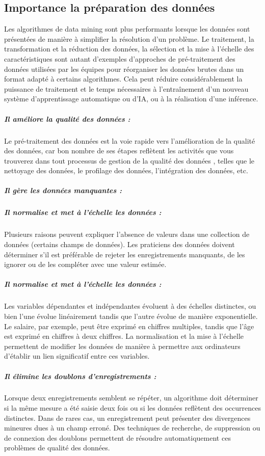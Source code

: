 \documentclass[a4paper, 12pt]{article}
\begin{document}
	\subsection{Importance la préparation des données }Les algorithmes de data mining sont plus performants lorsque les données sont présentées de manière à simplifier la résolution d'un problème.
	Le traitement, la transformation et la réduction des données, la sélection et la mise à l'échelle des caractéristiques sont autant d'exemples d'approches de pré-traitement des données utilisées par les équipes pour réorganiser les données brutes dans un format adapté à certains algorithmes. Cela peut réduire considérablement la puissance de traitement et le temps nécessaires à l'entraînement d'un nouveau système d'apprentissage automatique ou d'IA, ou à la réalisation d'une inférence.
	\subparagraph{\textbf{Il améliore la qualité des données :}}Le pré-traitement des données est la voie rapide vers l'amélioration de la qualité des données, car bon nombre de ses étapes reflètent les activités que vous trouverez dans tout processus de gestion de la qualité des données , telles que le nettoyage des données, le profilage des données, l'intégration des données, etc.
	\subparagraph{\textbf{Il gère les données manquantes :}}
	\subparagraph{\textbf{Il normalise et met à l'échelle les données :}}Plusieurs raisons peuvent expliquer l'absence de valeurs dans une collection de données (certains champs de données). Les praticiens des données doivent déterminer s'il est préférable de rejeter les enregistrements manquants, de les ignorer ou de les compléter avec une valeur estimée.
	\subparagraph{\textbf{Il normalise et met à l'échelle les données :}}Les variables dépendantes et indépendantes évoluent à des échelles distinctes, ou bien l'une évolue linéairement tandis que l'autre évolue de manière exponentielle. Le salaire, par exemple, peut être exprimé en chiffres multiples, tandis que l'âge est exprimé en chiffres à deux chiffres. La normalisation et la mise à l'échelle permettent de modifier les données de manière à permettre aux ordinateurs d'établir un lien significatif entre ces variables.
	\subparagraph{\textbf{Il élimine les doublons d'enregistrements :}}Lorsque deux enregistrements semblent se répéter, un algorithme doit déterminer si la même mesure a été saisie deux fois ou si les données reflètent des occurrences distinctes. Dans de rares cas, un enregistrement peut présenter des divergences mineures dues à un champ erroné. Des techniques de recherche, de suppression ou de connexion des doublons permettent de résoudre automatiquement ces problèmes de qualité des données.
\end{document}
